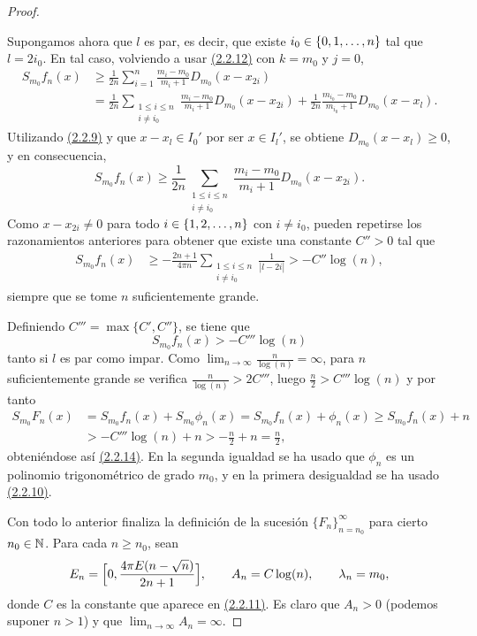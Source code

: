 \documentclass[a4paper, 12pt, oneside]{book}
\begin{document}
\begin{proof}
\begin{itemize}
        Supongamos ahora que $l$ es par, es decir, que existe $i_0 \in \{0,1,\mathellipsis,n\}$ tal que $l = 2i_0$. En tal caso, volviendo a usar \hyperref[2.2.12]{\color{blue}(2.2.12)} con $k = m_0$ y $j = 0$,
        \begin{align*}
            S_{m_0}f_n(x) &\geq \frac{1}{2n}\sum_{i=1}^n \frac{m_i-m_0}{m_i+1}D_{m_0}(x-x_{2i}) \\
            &=\frac{1}{2n}\sum_{\substack{1 \leq i \leq n \\ i \neq i_0}} \frac{m_i-m_0}{m_i+1}D_{m_0}(x-x_{2i})+\frac{1}{2n}\frac{m_{i_0}-m_0}{m_{i_0}+1}D_{m_0}(x-x_l).
        \end{align*}
        Utilizando \hyperref[2.2.9]{\color{blue}(2.2.9)} y que $x-x_l \in I_0'$ por ser $x \in I_l'$, se obtiene $D_{m_0}(x-x_l) \geq 0$, y en consecuencia,
        \[S_{m_0}f_n(x) \geq \frac{1}{2n}\sum_{\substack{1 \leq i \leq n \\ i \neq i_0}} \frac{m_i-m_0}{m_i+1}D_{m_0}(x-x_{2i}).\]
        Como $x-x_{2i} \neq 0$ para todo $i \in \{1,2,\mathellipsis,n\}$ con $i \neq i_0$, pueden repetirse los razonamientos anteriores para obtener que existe una constante $C'' > 0$ tal que
        \begin{align*}
            S_{m_0}f_n(x) &\geq -\frac{2n+1}{4\pi n}\sum_{\substack{1 \leq i \leq n \\ i \neq i_0}} \frac{1}{|l-2i|} > -C''\log(n),
        \end{align*}
        siempre que se tome $n$ suficientemente grande.

        Definiendo $C''' = \max\{C',C''\}$, se tiene que 
        \[S_{m_0}f_n(x) > -C'''\log(n)\] tanto si $l$ es par como impar. Como $\lim_{n \to \infty} \frac{n}{\log(n)} = \infty$, para $n$ suficientemente grande se verifica $\frac{n}{\log(n)}>2C'''$,
        luego $\frac{n}{2} > C'''\log(n)$ y por tanto 
        \begin{align*}
            S_{m_0}F_n(x) &= S_{m_0}f_n(x)+S_{m_0}\phi_n(x) = S_{m_0}f_n(x)+\phi_n(x) \geq S_{m_0}f_n(x)+n \\
            &> -C'''\log(n)+n > -\frac{n}{2}+n = \frac{n}{2},
        \end{align*}
        obteniéndose así \hyperref[2.2.14]{\color{blue}(2.2.14)}. En la segunda igualdad se ha usado que $\phi_n$ es un polinomio trigonométrico de grado $m_0$, y en la primera desigualdad se ha usado \hyperref[2.2.10]{\color{blue}(2.2.10)}.
    \end{itemize}

    Con todo lo anterior finaliza la definición de la sucesión $\{F_n\}_{n=n_0}^\infty$ para cierto $n_0\in\mathbb N$. Para cada $n \geq n_0$, sean
    \[E_n = \Bigl[0, \frac{4\pi E(n-\sqrt{n})}{2n+1}\Bigr], \qquad A_n = C\log(n), \qquad \lambda_n = m_0,\]
    donde $C$ es la constante que aparece en \hyperref[2.2.11]{\color{blue}(2.2.11)}. Es claro que $A_n > 0$ (podemos suponer $n>1$) y que $\lim_{n \to \infty} A_n = \infty$.
    

\end{proof}
\end{document}
